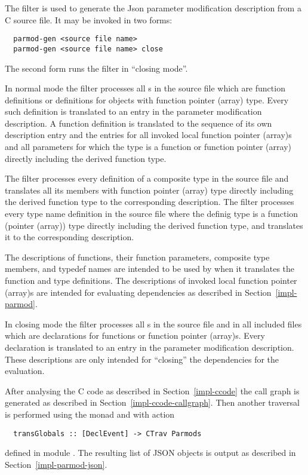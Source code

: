 The filter  is used to generate the Json parameter modification description from a C source file.
It may be invoked in two forms:
\begin{verbatim}
  parmod-gen <source file name>
  parmod-gen <source file name> close
\end{verbatim}
The second form runs the filter in ``closing mode''.

In normal mode the filter processes all s in the source file which are function
definitions or definitions for objects with function pointer (array) type. Every such definition is translated to an
entry in the parameter modification description. A function definition is translated to the sequence of its
own description entry and the entries for all invoked local function pointer (array)s and all parameters for which
the type is a function or function pointer (array) directly including the derived function type.

The filter processes every definition of a composite type in the source file and translates all
its members with function pointer (array) type directly including the derived function type to the corresponding
description. The filter processes every type name definition in the source file where the definig type
is a function (pointer (array)) type directly including the derived function type, and translates it to
the corresponding description.

The descriptions of functions, their function parameters, composite type members, and typedef names are 
intended to be used by 
when it translates the function and type definitions. The descriptions of invoked local function pointer (array)s
are intended for evaluating dependencies as described in Section~\ref{impl-parmod}.

In closing mode the filter processes all s in the source file and in all included files which
are declarations for functions or function pointer (array)s. Every declaration is translated to an entry in the parameter
modification description. These descriptions are only intended for ``closing'' the dependencies for the evaluation.

After analysing the C code as described in Section~\ref{impl-ccode} the call graph is generated as described
in Section~\ref{impl-ccode-callgraph}. Then another traversal is performed using the  monad and
 with action
\begin{verbatim}
  transGlobals :: [DeclEvent] -> CTrav Parmods
\end{verbatim}
defined in module . The resulting list of JSON objects is output as described 
in Section~\ref{impl-parmod-json}.

